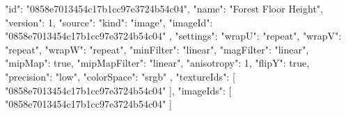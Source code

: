 {
  "id": "0858e7013454c17b1cc97e3724b54c04",
  "name": "Forest Floor Height",
  "version": 1,
  "source": {
    "kind": "image",
    "imageId": "0858e7013454c17b1cc97e3724b54c04"
  },
  "settings": {
    "wrapU": "repeat",
    "wrapV": "repeat",
    "wrapW": "repeat",
    "minFilter": "linear",
    "magFilter": "linear",
    "mipMap": true,
    "mipMapFilter": "linear",
    "anisotropy": 1,
    "flipY": true,
    "precision": "low",
    "colorSpace": "srgb"
  },
  "textureIds": [
    "0858e7013454c17b1cc97e3724b54c04"
  ],
  "imageIds": [
    "0858e7013454c17b1cc97e3724b54c04"
  ]
}
